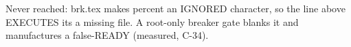 \documentclass{article}
\begin{document}

% 
Never reached: brk.tex makes percent an IGNORED character, so the line
above EXECUTES its  a missing file. A root-only breaker
gate blanks it and manufactures a false-READY (measured, C-34).
\end{document}

